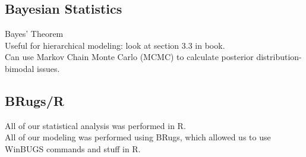 \documentclass{article}
\begin{document}
	\subsection{Bayesian Statistics}
	   	Bayes' Theorem \\
    	Useful for hierarchical modeling: look at section 3.3 in book. \\
    	Can use Markov Chain Monte Carlo (MCMC) to calculate posterior 
			distribution- bimodal issues.
	\subsection{BRugs/R}
    	All of our statistical analysis was performed in R.  \\
    	All of our modeling was performed using BRugs, which allowed us to use 
			WinBUGS commands and stuff in R.
\end{document}
